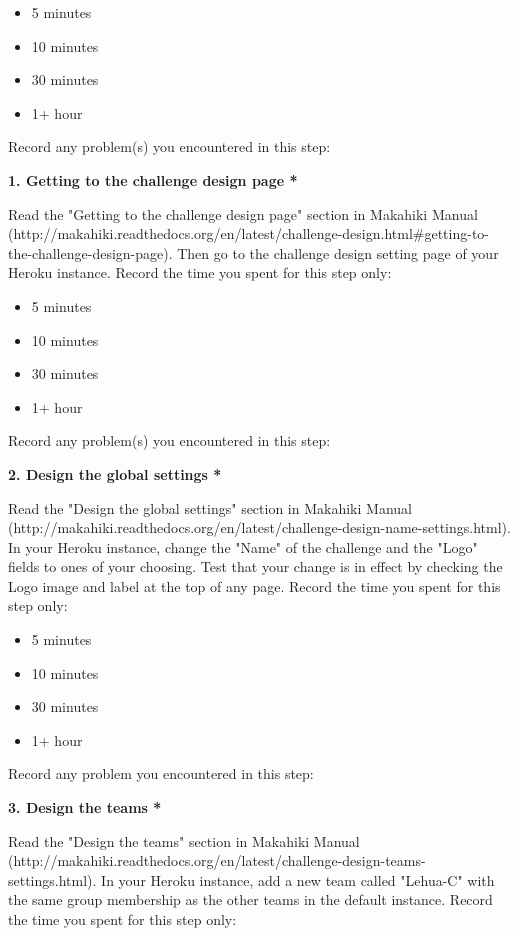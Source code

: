 \begin{itemize}
\item 5 minutes
\item  10 minutes
\item  30 minutes
\item  1+ hour
\end{itemize}

Record any problem(s) you encountered in this step:

{\bf 1. Getting to the challenge design page *}

Read the "Getting to the challenge design page" section in Makahiki Manual (http://makahiki.readthedocs.org/en/latest/challenge-design.html\#getting-to-the-challenge-design-page). Then go to the challenge design setting page of your Heroku instance. Record the time you spent for this step only:

\begin{itemize}
\item 5 minutes
\item  10 minutes
\item  30 minutes
\item  1+ hour
\end{itemize}

Record any problem(s) you encountered in this step:

{\bf 2. Design the global settings *}

Read the "Design the global settings" section in Makahiki Manual (http://makahiki.readthedocs.org/en/latest/challenge-design-name-settings.html). In your Heroku instance, change the "Name" of the challenge and the "Logo" fields to ones of your choosing. Test that your change is in effect by checking the Logo image and label at the top of any page. Record the time you spent for this step only:

\begin{itemize}
\item 5 minutes
\item  10 minutes
\item  30 minutes
\item  1+ hour
\end{itemize}


Record any problem you encountered in this step:

{\bf 3. Design the teams *}

Read the "Design the teams" section in Makahiki Manual (http://makahiki.readthedocs.org/en/latest/challenge-design-teams-settings.html). In your Heroku instance, add a new team called "Lehua-C" with the same group membership as the other teams in the default instance. Record the time you spent for this step only:

